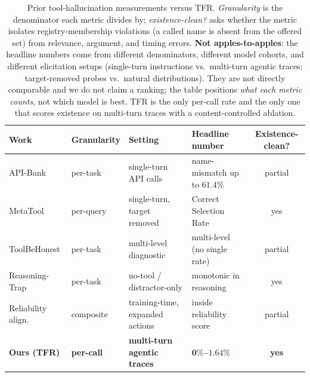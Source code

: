 \begin{table}[tb]
\caption{Prior tool-hallucination measurements versus TFR. \emph{Granularity}
is the denominator each metric divides by; \emph{existence-clean?} asks whether
the metric isolates registry-membership violations (a called name is absent from
the offered set) from relevance, argument, and timing errors. \textbf{Not
apples-to-apples}: the headline numbers come from different denominators,
different model cohorts, and different elicitation setups (single-turn
instructions vs.\ multi-turn agentic traces; target-removed probes vs.\ natural
distributions). They are not directly comparable and we do not claim a ranking;
the table positions \emph{what each metric counts}, not which model is best.
TFR is the only per-call rate and the only one that scores existence on
multi-turn traces with a content-controlled ablation.}
\label{tab:priorart}
\centering
\small
\setlength{\tabcolsep}{4pt}
\begin{tabular}{llp{3.4cm}p{3.4cm}c}
\toprule
Work & Granularity & Setting & Headline number & Existence-clean? \\
\midrule
API-Bank \citep{li2023apibank}
  & per-task
  & single-turn API calls
  & name-mismatch up to $61.4\%$
  & partial \\
MetaTool \citep{huang2024metatool}
  & per-query
  & single-turn, target removed
  & Correct Selection Rate
  & yes \\
ToolBeHonest \citep{toolbehonest2024}
  & per-task
  & multi-level diagnostic
  & multi-level (no single rate)
  & partial \\
Reasoning-Trap \citep{yin2026reasoningtrap}
  & per-task
  & no-tool / distractor-only
  & monotonic in reasoning
  & yes \\
Reliability align.\ \citep{cao2025reliability}
  & composite
  & training-time, expanded actions
  & inside reliability score
  & partial \\
\midrule
\textbf{Ours (TFR)}
  & \textbf{per-call}
  & \textbf{multi-turn agentic traces}
  & $\mathbf{0\%}$\textbf{--}$\mathbf{1.64\%}$
  & \textbf{yes} \\
\bottomrule
\end{tabular}
\end{table}

